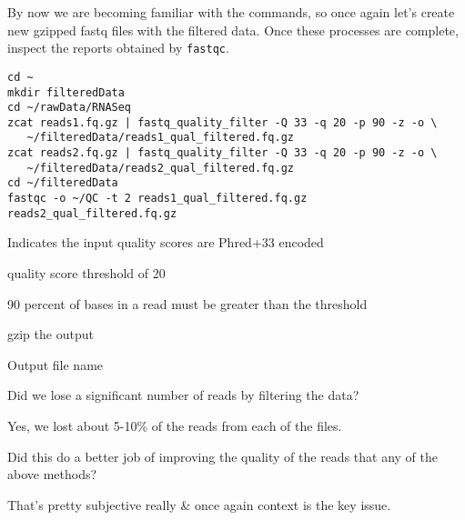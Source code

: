 \begin{steps}
By now we are becoming familiar with the commands, so once again let's create new gzipped fastq files with the filtered data.
Once these processes are complete, inspect the reports obtained by \texttt{fastqc}.
\begin{lstlisting}
cd ~
mkdir filteredData
cd ~/rawData/RNASeq
zcat reads1.fq.gz | fastq_quality_filter -Q 33 -q 20 -p 90 -z -o \
   ~/filteredData/reads1_qual_filtered.fq.gz
zcat reads2.fq.gz | fastq_quality_filter -Q 33 -q 20 -p 90 -z -o \
   ~/filteredData/reads2_qual_filtered.fq.gz
cd ~/filteredData
fastqc -o ~/QC -t 2 reads1_qual_filtered.fq.gz reads2_qual_filtered.fq.gz
\end{lstlisting}
\end{steps}

\begin{note}
\begin{description}[style=multiline,labelindent=0cm,align=right,leftmargin=0.8\descriptionlabelspace,rightmargin=1.5cm,font=\ttfamily]
\item[-Q 33] Indicates the input quality scores are Phred+33 encoded
\item[-q 20] quality score threshold of 20
\item[-p 90] 90 percent of bases in a read must be greater than the threshold
\item[-z] gzip the output
\item[-o] Output file name
\end{description}
\end{note}

\begin{questions}
Did we lose a significant number of reads by filtering the data? \\
\begin{answer}
Yes, we lost about 5-10\% of the reads from each of the files. \\
\end{answer}

Did this do a better job of improving the quality of the reads that any of the above methods? \\
\begin{answer}
That's pretty subjective really \& once again context is the key issue. \\
\end{answer}
\end{questions}

